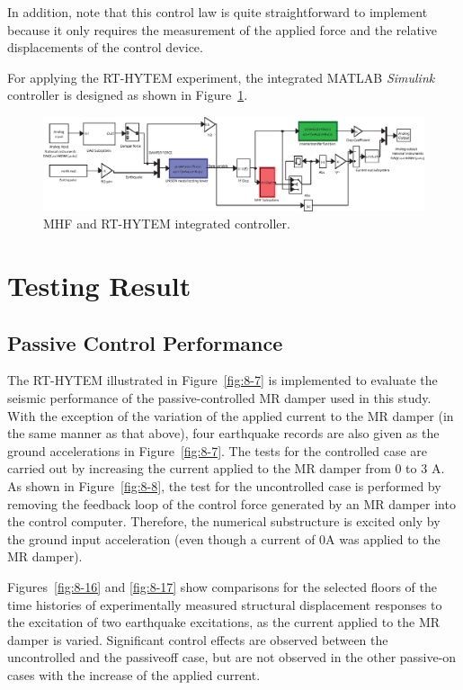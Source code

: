 In addition, note that this control law is quite straightforward to implement because it only requires the measurement of the applied force and the relative displacements of the control device.

For applying the RT-HYTEM experiment, the integrated MATLAB \textit{Simulink} controller is designed as shown in Figure~\ref{fig:8-15}.

\begin{figure}[H]
\centering
\includegraphics[width=1\textwidth] {figure/8-15.eps}
\caption{MHF and RT-HYTEM integrated controller.}
\label{fig:8-15}
\end{figure}

\section{Testing Result}
\subsection{Passive Control Performance}

The RT-HYTEM illustrated in Figure~\ref{fig:8-7} is implemented to evaluate the seismic performance of the passive-controlled MR damper used in this study. With the exception of the variation of the applied current to the MR damper (in the same manner as that above), four earthquake records are also given as the ground accelerations in Figure~\ref{fig:8-7}. The tests for the controlled case are carried out by increasing the current applied to the MR damper from 0 to 3 A. As shown in Figure~\ref{fig:8-8}, the test for the uncontrolled case is performed by removing the feedback loop of the control force generated by an MR damper into the control computer. Therefore, the numerical substructure is excited only by the ground input acceleration (even though a current of 0A was applied to the MR damper).

Figures~\ref{fig:8-16} and \ref{fig:8-17} show comparisons for the selected floors of the time histories of experimentally measured structural displacement responses to the excitation of two earthquake excitations, as the current applied to the MR damper is varied. Significant control effects are observed between the uncontrolled and the passiveoff case, but are not observed in the other passive-on cases with the increase of the applied current.

